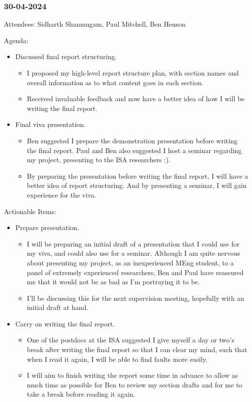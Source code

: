 \subsubsection{30-04-2024}
Attendees: Sidharth Shanmugam, Paul Mitchell, Ben Henson

Agenda:

\begin{itemize}
    \item Discussed final report structuring.
    \begin{itemize}
        \item I proposed my high-level report structure plan, with section names and overall information as to what content goes in each section.
        \item Received invaluable feedback and now have a better idea of how I will be writing the final report.
    \end{itemize}

    \item Final viva presentation.
    \begin{itemize}
        \item Ben suggested I prepare the demonstration presentation before writing the final report. Paul and Ben also suggested I host a seminar regarding my project, presenting to the ISA researchers :).
        \item By preparing the presentation before writing the final report, I will have a better idea of report structuring. And by presenting a seminar, I will gain experience for the viva.
    \end{itemize}
\end{itemize}

Actionable Items:

\begin{itemize}
    \item Prepare presentation.
    \begin{itemize}
        \item I will be preparing an initial draft of a presentation that I could use for my viva, and could also use for a seminar. Although I am quite nervous about presenting my project, as an inexperienced MEng student, to a panel of extremely experienced researchers, Ben and Paul have reassured me that it would not be as bad as I'm portraying it to be.
        \item I'll be discussing this for the next supervision meeting, hopefully with an initial draft at hand.
    \end{itemize}

    \item Carry on writing the final report.
    \begin{itemize}
        \item One of the postdocs at the ISA suggested I give myself a day or two's break after writing the final report so that I can clear my mind, such that when I read it again, I will be able to find faults more easily.
        \item I will aim to finish writing the report some time in advance to allow as much time as possible for Ben to review my section drafts and for me to take a break before reading it again.
    \end{itemize}
\end{itemize}
